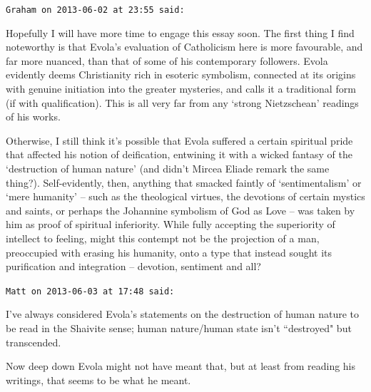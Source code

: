 \begin{footnotesize}
\begin{sffamily}
\texttt{Graham on 2013-06-02 at 23:55 said: }

Hopefully I will have more time to engage this essay soon. The first thing I find noteworthy is that Evola's evaluation of Catholicism here is more favourable, and far more nuanced, than that of some of his contemporary followers. Evola evidently deems Christianity rich in esoteric symbolism, connected at its origins with genuine initiation into the greater mysteries, and calls it a traditional form (if with qualification). This is all very far from any `strong Nietzschean' readings of his works.

Otherwise, I still think it's possible that Evola suffered a certain spiritual pride that affected his notion of deification, entwining it with a wicked fantasy of the `destruction of human nature' (and didn't Mircea Eliade remark the same thing?). Self-evidently, then, anything that smacked faintly of `sentimentalism' or `mere humanity’ – such as the theological virtues, the devotions of certain mystics and saints, or perhaps the Johannine symbolism of God as Love – was taken by him as proof of spiritual inferiority. While fully accepting the superiority of intellect to feeling, might this contempt not be the projection of a man, preoccupied with erasing his humanity, onto a type that instead sought its purification and integration – devotion, sentiment and all?


\hfill

\texttt{Matt on 2013-06-03 at 17:48 said: }

I've always considered Evola's statements on the destruction of human nature to be read in the Shaivite sense; human nature/human state isn't ``destroyed" but transcended.

Now deep down Evola might not have meant that, but at least from reading his writings, that seems to be what he meant.


\end{sffamily}\end{footnotesize}
